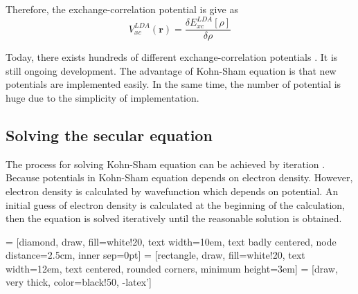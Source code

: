 \documentclass[a4paper, 12pt, titlepage,oneside,drop]{kthesis}
\begin{document}
Therefore, the exchange-correlation potential is give as
\begin{equation}
 V_{xc}^{LDA}(\textbf{r}) = \frac{\delta  E^{LDA}_{xc}[\rho]}{\delta \rho}
\end{equation}

Today, there exists hundreds of different exchange-correlation potentials \cite{tozer1998development, hamprecht1998development, grabo1995density, cohen2007development}. It is still ongoing development. The advantage of Kohn-Sham equation is that new potentials are implemented easily. In the same time, the number of potential is huge due to
the simplicity of implementation.

\subsection{Solving the secular equation}

The process for solving Kohn-Sham equation can be achieved by iteration \cite{martin2004electronic, Cottenierwien2k, clasdft}. Because potentials in Kohn-Sham equation depends on electron density. However, electron density is calculated by wavefunction which depends on potential. 
An initial guess of electron density is calculated at the beginning of the calculation, then the equation is solved iteratively until the reasonable solution is obtained.

 = [diamond, draw, fill=white!20,
    text width=10em, text badly centered, node distance=2.5cm, inner sep=0pt]
 = [rectangle, draw, fill=white!20,
    text width=12em, text centered, rounded corners, minimum height=3em]
 = [draw, very thick, color=black!50, -latex']
\end{document}
